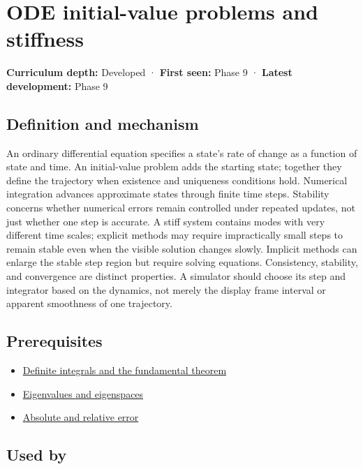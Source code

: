 \hypertarget{appendix-e8ab9836882e}{}\label{referencestart:appendix-e8ab9836882e}
\section{ODE initial-value problems and stiffness}\label{appendix-e8ab9836882e-ode-initial-value-problems-and-stiffness}

\textbf{Curriculum depth:} Developed · \textbf{First seen:} Phase 9 · \textbf{Latest development:} Phase 9

\subsection{Definition and mechanism}\label{appendix-e8ab9836882e-definition-and-mechanism}

An ordinary differential equation specifies a state's rate of change as a function of state and time. An initial-value problem adds the starting state; together they define the trajectory when existence and uniqueness conditions hold. Numerical integration advances approximate states through finite time steps. Stability concerns whether numerical errors remain controlled under repeated updates, not just whether one step is accurate. A stiff system contains modes with very different time scales; explicit methods may require impractically small steps to remain stable even when the visible solution changes slowly. Implicit methods can enlarge the stable step region but require solving equations. Consistency, stability, and convergence are distinct properties. A simulator should choose its step and integrator based on the dynamics, not merely the display frame interval or apparent smoothness of one trajectory.

\subsection{Prerequisites}\label{appendix-e8ab9836882e-prerequisites}

\begin{itemize}
\tightlist
\item
  \hyperref[appendix-1a50e72435c2]{Definite integrals and the fundamental theorem}
\item
  \hyperref[appendix-0b3be18411f9]{Eigenvalues and eigenspaces}
\item
  \hyperref[appendix-3ae74e89b4e6]{Absolute and relative error}
\end{itemize}

\subsection{Used by}\label{appendix-e8ab9836882e-used-by}

